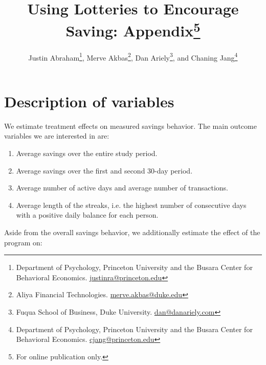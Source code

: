 \documentclass[10pt]{article}
\begin{document}
\title{Using Lotteries to Encourage Saving: Appendix\thanks{For online publication only.}}

\author{Justin Abraham\thanks{Department of Psychology, Princeton University and the Busara Center for Behavioral Economics. \protect\href{mailto:justinra@princeton.edu}{justinra@princeton.edu}}, Merve Akbas\thanks{Aliya Financial Technologies. \protect\href{mailto:merve.akbas@duke.edu}{merve.akbas@duke.edu}}, Dan Ariely\thanks{Fuqua School of Business, Duke University. \protect\href{mailto:dan@danariely.com}{dan@danariely.com}}, and Chaning Jang\thanks{Department of Psychology, Princeton University and the Busara Center for Behavioral Economics. \protect\href{mailto:cjang@princeton.edu}{cjang@princeton.edu}}} %

\maketitle

\newpage

\tableofcontents

\newpage

\appendix

\section{Description of variables}

	We estimate treatment effects on measured savings behavior. The main outcome variables we are interested in are:

		\begin{enumerate}
		\item Average savings over the entire study period.
		\item Average savings over the first and second 30-day period.
		\item Average number of active days and average number of transactions.
		\item Average length of the streaks, i.e. the highest number of consecutive days with a positive daily balance for each person.
		\end{enumerate}

	Aside from the overall savings behavior, we additionally estimate the effect of the program on:
\end{document}
